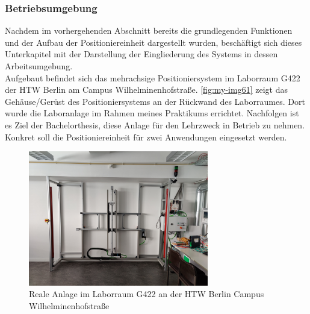 \documentclass[../../../Bachelorarbeit.tex]{subfiles}
\begin{document}
\subsubsection{Betriebsumgebung}
Nachdem im vorhergehenden Abschnitt bereits die grundlegenden Funktionen und der Aufbau der Positioniereinheit dargestellt wurden, beschäftigt sich dieses Unterkapitel mit der Darstellung der Eingliederung des Systems in dessen Arbeitsumgebung.\\
Aufgebaut befindet sich das mehrachsige Positioniersystem im Laborraum G422 der HTW Berlin am Campus Wilhelminenhofstraße. \autoref{fig:my-img61} zeigt das Gehäuse/Gerüst des Positioniersystems an der Rückwand des Laborraumes. Dort wurde die Laboranlage im Rahmen meines Praktikums errichtet. Nachfolgen ist es Ziel der Bachelorthesis, diese Anlage für den Lehrzweck in Betrieb zu nehmen. Konkret soll die Positioniereinheit für zwei Anwendungen eingesetzt werden.\\

\begin{figure}[H]
    \centering
    \includegraphics[width=0.7\textwidth]{Images/laborraum.jpg}
    \caption[Laborraum]{Reale Anlage im Laborraum G422 an der HTW Berlin Campus Wilhelminenhofstraße}
    \label{fig:my-img61}
\end{figure}
\end{document}

